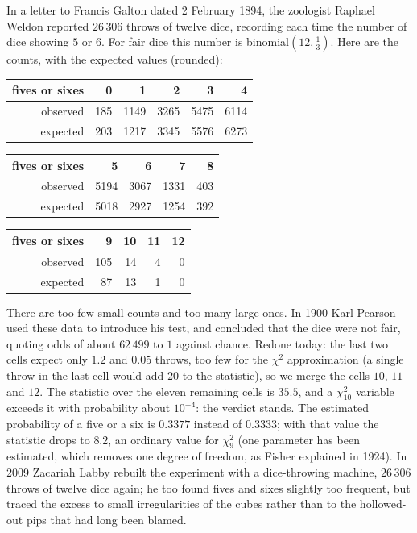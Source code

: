 \begin{example}\label{ex:weldon}
In a letter to Francis Galton dated 2 February 1894, the zoologist Raphael Weldon reported $26\,306$ throws of twelve dice, recording each time the
number of dice showing $5$ or $6$. For fair dice this number is binomial$(12,\frac13)$. Here are the counts, with the expected values (rounded):
\begin{center}
\small
\begin{tabular}{r|rrrrr}
fives or sixes&0&1&2&3&4\\\hline
observed&185&1149&3265&5475&6114\\
expected&203&1217&3345&5576&6273
\end{tabular}
\par\medskip
\begin{tabular}{r|rrrr}
fives or sixes&5&6&7&8\\\hline
observed&5194&3067&1331&403\\
expected&5018&2927&1254&392
\end{tabular}
\par\medskip
\begin{tabular}{r|rrrr}
fives or sixes&9&10&11&12\\\hline
observed&105&14&4&0\\
expected&87&13&1&0
\end{tabular}
\end{center}
There are too few small counts and too many large ones. In 1900 Karl Pearson used these data to introduce his test, and concluded that the dice
were not fair, quoting odds of about $62\,499$ to $1$ against chance. Redone today: the last two cells expect only $1.2$ and $0.05$ throws, too few
for the $\chi^2$ approximation (a single throw in the last cell would add $20$ to the statistic), so we merge the cells $10$, $11$ and $12$. The
statistic over the eleven remaining cells is $35.5$, and a $\chi^2_{10}$ variable exceeds it with probability about $10^{-4}$: the verdict stands. The
estimated probability of a five or a six is $0.3377$ instead of $0.3333$; with that value the statistic drops to $8.2$, an ordinary value for
$\chi^2_9$ (one parameter has been estimated, which removes one degree of freedom, as Fisher explained in 1924). In 2009 Zacariah Labby rebuilt the experiment with a dice-throwing
machine, $26\,306$ throws of twelve dice again; he too found fives and sixes slightly too frequent, but traced the excess to small irregularities of
the cubes rather than to the hollowed-out pips that had long been blamed.
\end{example}

